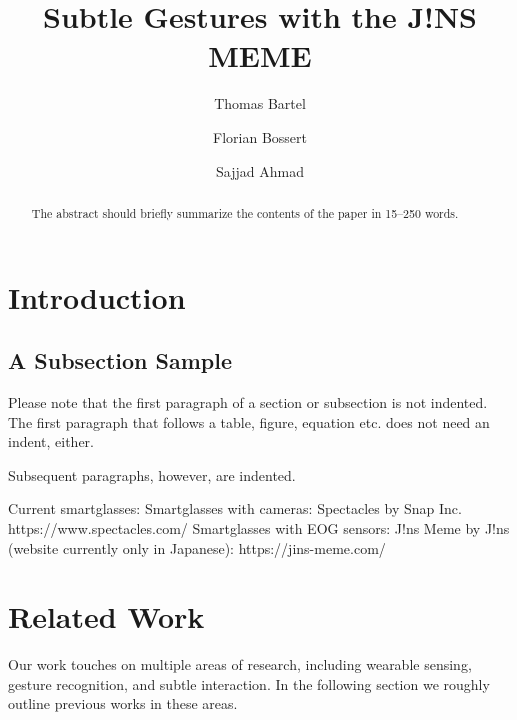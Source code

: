 \documentclass[runningheads]{llncs}
\begin{document}
%
\title{Subtle Gestures with the J!NS MEME}
%
%
\author{Thomas Bartel \and
Florian Bossert \and
Sajjad Ahmad}
%
%
%
\maketitle              %
%
\begin{abstract}
The abstract should briefly summarize the contents of the paper in
15--250 words.

\end{abstract}
%
%
%
\section{Introduction}
\subsection{A Subsection Sample}
Please note that the first paragraph of a section or subsection is
not indented. The first paragraph that follows a table, figure,
equation etc. does not need an indent, either.

Subsequent paragraphs, however, are indented.

Current smartglasses:
Smartglasses with cameras: Spectacles by Snap Inc. https://www.spectacles.com/
Smartglasses with EOG sensors: J!ns Meme by J!ns (website currently only in Japanese):
https://jins-meme.com/

\section{Related Work}
Our work touches on multiple areas of research, including wearable sensing, gesture
recognition, and subtle interaction. In the following section we roughly outline
previous works in these areas.
\end{document}
